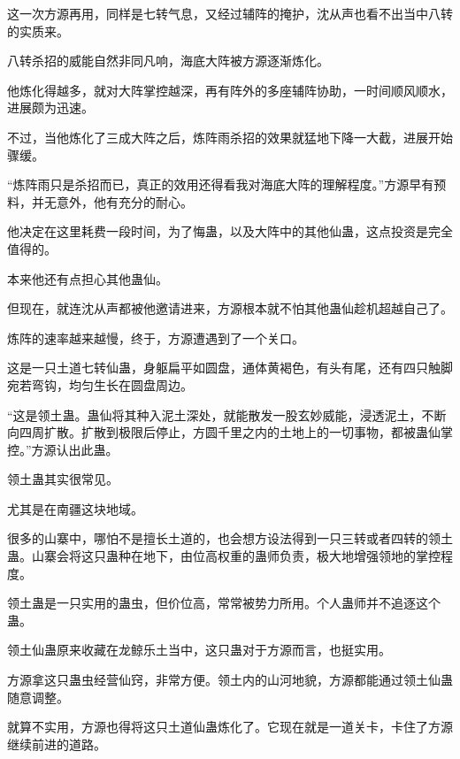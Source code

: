 \begin{this_body}
这一次方源再用，同样是七转气息，又经过辅阵的掩护，沈从声也看不出当中八转的实质来。

八转杀招的威能自然非同凡响，海底大阵被方源逐渐炼化。

他炼化得越多，就对大阵掌控越深，再有阵外的多座辅阵协助，一时间顺风顺水，进展颇为迅速。

不过，当他炼化了三成大阵之后，炼阵雨杀招的效果就猛地下降一大截，进展开始骤缓。

“炼阵雨只是杀招而已，真正的效用还得看我对海底大阵的理解程度。”方源早有预料，并无意外，他有充分的耐心。

他决定在这里耗费一段时间，为了悔蛊，以及大阵中的其他仙蛊，这点投资是完全值得的。

本来他还有点担心其他蛊仙。

但现在，就连沈从声都被他邀请进来，方源根本就不怕其他蛊仙趁机超越自己了。

炼阵的速率越来越慢，终于，方源遭遇到了一个关口。

这是一只土道七转仙蛊，身躯扁平如圆盘，通体黄褐色，有头有尾，还有四只触脚宛若弯钩，均匀生长在圆盘周边。

“这是领土蛊。蛊仙将其种入泥土深处，就能散发一股玄妙威能，浸透泥土，不断向四周扩散。扩散到极限后停止，方圆千里之内的土地上的一切事物，都被蛊仙掌控。”方源认出此蛊。

领土蛊其实很常见。

尤其是在南疆这块地域。

很多的山寨中，哪怕不是擅长土道的，也会想方设法得到一只三转或者四转的领土蛊。山寨会将这只蛊种在地下，由位高权重的蛊师负责，极大地增强领地的掌控程度。

领土蛊是一只实用的蛊虫，但价位高，常常被势力所用。个人蛊师并不追逐这个蛊。

领土仙蛊原来收藏在龙鲸乐土当中，这只蛊对于方源而言，也挺实用。

方源拿这只蛊虫经营仙窍，非常方便。领土内的山河地貌，方源都能通过领土仙蛊随意调整。

就算不实用，方源也得将这只土道仙蛊炼化了。它现在就是一道关卡，卡住了方源继续前进的道路。

\end{this_body}


